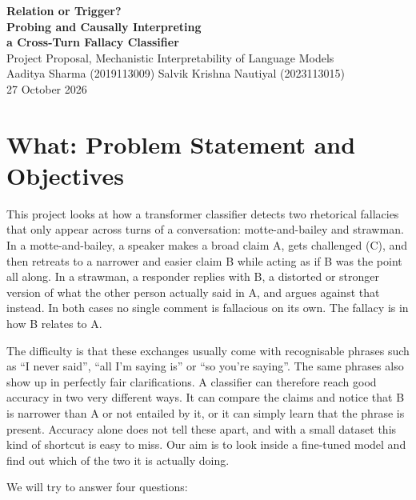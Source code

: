 \documentclass[11pt,a4paper]{article}
\begin{document}
\begin{center}
{\LARGE\bfseries Relation or Trigger?}\\[6pt]
{\Large\bfseries Probing and Causally Interpreting\\[2pt] a Cross-Turn Fallacy Classifier}\\[14pt]
{\large Project Proposal, Mechanistic Interpretability of Language Models}\\[10pt]
Aaditya Sharma (2019113009) \quad\textperiodcentered\quad Salvik Krishna Nautiyal (2023113015)\\[4pt]
27 October 2026
\end{center}

\vspace{6pt}

\section{What: Problem Statement and Objectives}

This project looks at how a transformer classifier detects two rhetorical fallacies that only appear across turns of a conversation: motte-and-bailey and strawman. In a motte-and-bailey, a speaker makes a broad claim A, gets challenged (C), and then retreats to a narrower and easier claim B while acting as if B was the point all along. In a strawman, a responder replies with B, a distorted or stronger version of what the other person actually said in A, and argues against that instead. In both cases no single comment is fallacious on its own. The fallacy is in how B relates to A.

The difficulty is that these exchanges usually come with recognisable phrases such as ``I never said'', ``all I'm saying is'' or ``so you're saying''. The same phrases also show up in perfectly fair clarifications. A classifier can therefore reach good accuracy in two very different ways. It can compare the claims and notice that B is narrower than A or not entailed by it, or it can simply learn that the phrase is present. Accuracy alone does not tell these apart, and with a small dataset this kind of shortcut is easy to miss. Our aim is to look inside a fine-tuned model and find out which of the two it is actually doing.

We will try to answer four questions:
\end{document}
